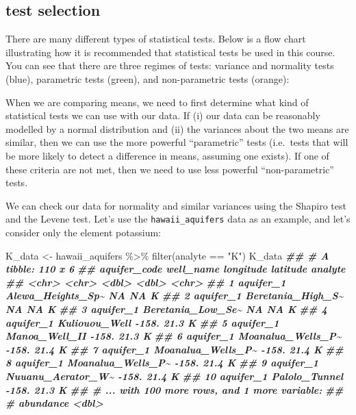 \documentclass[
]{krantz}
\newenvironment{Shaded}{\begin{snugshade}}{\end{snugshade}}
\newcommand{\DocumentationTok}[1]{\textcolor[rgb]{0.56,0.35,0.01}{\textbf{\textit{#1}}}}
\newcommand{\FunctionTok}[1]{\textcolor[rgb]{0.00,0.00,0.00}{#1}}
\newcommand{\NormalTok}[1]{#1}
\newcommand{\OtherTok}[1]{\textcolor[rgb]{0.56,0.35,0.01}{#1}}
\newcommand{\SpecialCharTok}[1]{\textcolor[rgb]{0.00,0.00,0.00}{#1}}
\newcommand{\StringTok}[1]{\textcolor[rgb]{0.31,0.60,0.02}{#1}}
\begin{document}
\hypertarget{test-selection}{%
\subsection{test selection}\label{test-selection}}

There are many different types of statistical tests. Below is a flow chart illustrating how it is recommended that statistical tests be used in this course. You can see that there are three regimes of tests: variance and normality tests (blue), parametric tests (green), and non-parametric tests (orange):

When we are comparing means, we need to first determine what kind of statistical tests we can use with our data. If (i) our data can be reasonably modelled by a normal distribution and (ii) the variances about the two means are similar, then we can use the more powerful ``parametric'' tests (i.e.~tests that will be more likely to detect a difference in means, assuming one exists). If one of these criteria are not met, then we need to use less powerful ``non-parametric'' tests.

We can check our data for normality and similar variances using the Shapiro test and the Levene test. Let's use the \texttt{hawaii\_aquifers} data as an example, and let's consider only the element potassium:

\begin{Shaded}
\begin{Highlighting}[]
\NormalTok{K\_data }\OtherTok{\textless{}{-}}\NormalTok{ hawaii\_aquifers }\SpecialCharTok{\%\textgreater{}\%}
  \FunctionTok{filter}\NormalTok{(analyte }\SpecialCharTok{==} \StringTok{"K"}\NormalTok{)}
\NormalTok{  K\_data}
\DocumentationTok{\#\# \# A tibble: 110 x 6}
\DocumentationTok{\#\#    aquifer\_code well\_name         longitude latitude analyte}
\DocumentationTok{\#\#    \textless{}chr\textgreater{}        \textless{}chr\textgreater{}                 \textless{}dbl\textgreater{}    \textless{}dbl\textgreater{} \textless{}chr\textgreater{}  }
\DocumentationTok{\#\#  1 aquifer\_1    Alewa\_Heights\_Sp\textasciitilde{}       NA      NA   K      }
\DocumentationTok{\#\#  2 aquifer\_1    Beretania\_High\_S\textasciitilde{}       NA      NA   K      }
\DocumentationTok{\#\#  3 aquifer\_1    Beretania\_Low\_Se\textasciitilde{}       NA      NA   K      }
\DocumentationTok{\#\#  4 aquifer\_1    Kuliouou\_Well         {-}158.     21.3 K      }
\DocumentationTok{\#\#  5 aquifer\_1    Manoa\_Well\_II         {-}158.     21.3 K      }
\DocumentationTok{\#\#  6 aquifer\_1    Moanalua\_Wells\_P\textasciitilde{}     {-}158.     21.4 K      }
\DocumentationTok{\#\#  7 aquifer\_1    Moanalua\_Wells\_P\textasciitilde{}     {-}158.     21.4 K      }
\DocumentationTok{\#\#  8 aquifer\_1    Moanalua\_Wells\_P\textasciitilde{}     {-}158.     21.4 K      }
\DocumentationTok{\#\#  9 aquifer\_1    Nuuanu\_Aerator\_W\textasciitilde{}     {-}158.     21.4 K      }
\DocumentationTok{\#\# 10 aquifer\_1    Palolo\_Tunnel         {-}158.     21.3 K      }
\DocumentationTok{\#\# \# ... with 100 more rows, and 1 more variable:}
\DocumentationTok{\#\# \#   abundance \textless{}dbl\textgreater{}}
\end{Highlighting}
\end{Shaded}
\end{document}
